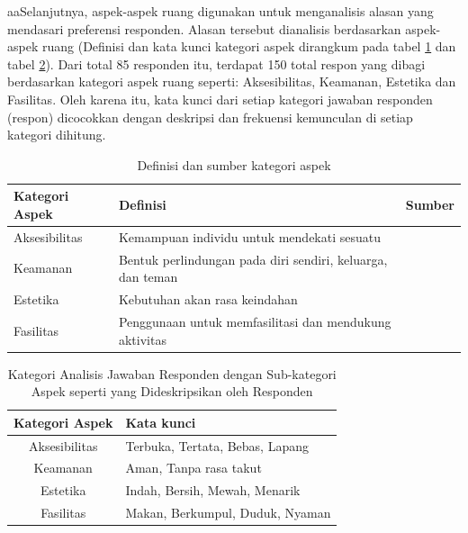 \documentclass[11pt]{udthesis} %
\begin{document}
aaSelanjutnya, aspek-aspek ruang digunakan untuk menganalisis alasan yang mendasari preferensi responden.
Alasan tersebut dianalisis berdasarkan aspek-aspek ruang (Definisi dan kata kunci kategori aspek dirangkum pada tabel \ref{tab:defasp} dan tabel \ref{tab:katasp}). Dari total 85 responden itu, terdapat 150 total respon yang dibagi berdasarkan kategori aspek ruang seperti: Aksesibilitas, Keamanan, Estetika dan Fasilitas. Oleh karena itu, kata kunci dari setiap kategori jawaban responden (respon) dicocokkan dengan deskripsi dan frekuensi kemunculan di setiap kategori dihitung.

\begin{table}[htpb]
    \centering
    \caption{Definisi dan sumber kategori aspek}
    \label{tab:defasp}
    \begin{tabular}{p{2.2cm} p{} l}
        \toprule
        \textbf{Kategori Aspek} & \textbf{Definisi} & \textbf{Sumber}\\
\midrule
Aksesibilitas & Kemampuan individu untuk mendekati sesuatu  & \cite{larosa2018} \\
Keamanan & Bentuk perlindungan pada diri sendiri, keluarga, dan teman & \cite{carr1992} \\
Estetika & Kebutuhan akan rasa keindahan & \cite{hradilova2013} \\
Fasilitas & Penggunaan untuk memfasilitasi dan mendukung aktivitas  & \cite{carmona2021} \\
\bottomrule
    \end{tabular}
\end{table}

\begin{table}[ht]
    \centering
    \caption{Kategori Analisis Jawaban Responden dengan Sub-kategori Aspek seperti yang Dideskripsikan oleh Responden}
    \label{tab:katasp}
    \begin{tabular}{c l}
        \toprule
        \textbf{Kategori Aspek} & \textbf{Kata kunci}\\
\midrule
Aksesibilitas & Terbuka, Tertata, Bebas, Lapang \\
Keamanan & Aman, Tanpa rasa takut\\
Estetika & Indah, Bersih, Mewah, Menarik \\
Fasilitas & Makan, Berkumpul, Duduk, Nyaman \\
\bottomrule
    \end{tabular}
\end{table}





\end{document}
